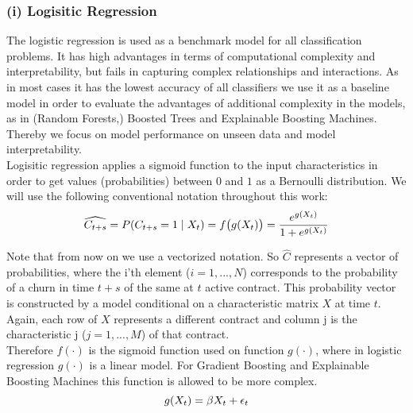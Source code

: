 \documentclass[12pt,titlepage]{article}
\begin{document}
\subsubsection*{(i) Logisitic Regression}
The logistic regression is used as a benchmark model for all classification problems. It has high advantages in terms of computational complexity and interpretability,
but fails in capturing complex relationships and interactions. As in most cases it has the lowest accuracy of all classifiers we use it as a baseline model in order to
evaluate the advantages of additional complexity in the models, as in (Random Forests,) Boosted Trees and Explainable Boosting Machines. Thereby we focus on model performance on unseen data and model interpretability.\\
Logisitic regression applies a sigmoid function to the input characteristics in order to get values (probabilities) between $0$ and $1$ as a Bernoulli distribution. We will use the following conventional notation throughout this work: \\

\begin{equation} \label{bern_dist}
    \widehat{C_{t+s}} = P(C_{t+s}=1\mid X_{t}) = f\big(g(X_{t})\big) = \frac{e^{g(X_{t})}}{1 + e^{g(X_{t})}} \\
\end{equation}

Note that from now on we use a vectorized notation. So $\hat{C}$ represents a vector of probabilities, where the i'th element ($i = 1,...,N$) corresponds to the probability of a churn in time $t+s$ of the same at $t$ active contract. This probability vector is constructed by a model conditional on a characteristic matrix $X$ at time $t$. Again, each row of $X$ represents a different contract and column j is the characteristic j ($j = 1,...,M$) of that contract. \\
Therefore $f(\cdot)$ is the sigmoid function used on function $g(\cdot)$, where in logistic regression $g(\cdot)$ is a linear model. For Gradient Boosting and Explainable Boosting Machines this function is allowed to be more complex. \\

\begin{equation} \label{lin_model}
    g(X_{t}) = \beta X_{t} + \epsilon_{t} \\
\end{equation}
\end{document}
